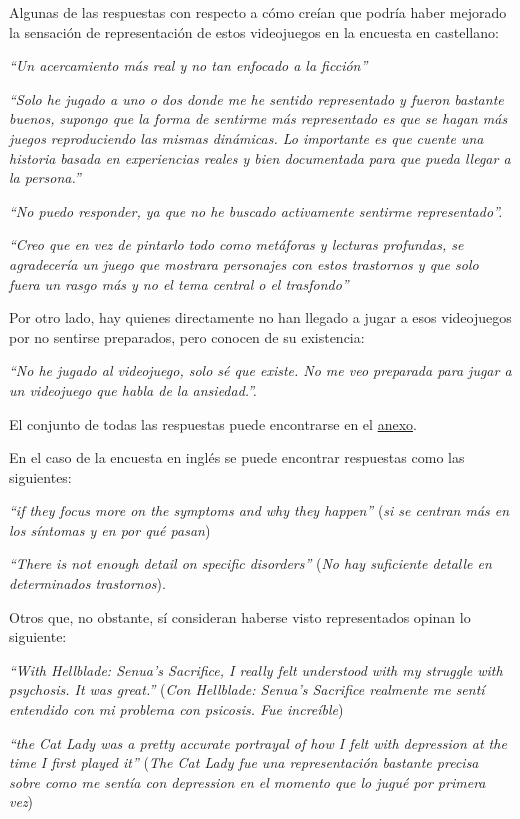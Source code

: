 \documentclass[12pt, a4paper,twoside,titlepage]{book}
\begin{document}
Algunas de las respuestas con respecto a cómo creían que podría haber mejorado la sensación de representación de estos videojuegos en la encuesta en castellano: 

\textit{``Un acercamiento más real y no tan enfocado a la ficción''}

\textit{``Solo he jugado a uno o dos donde me he sentido representado y fueron bastante buenos, supongo que la forma de sentirme más representado es que se hagan más juegos reproduciendo las mismas dinámicas. Lo importante es que cuente una historia basada en experiencias reales y bien documentada para que pueda llegar a la persona.''}

\textit{``No puedo responder, ya que no he buscado activamente sentirme representado''.}

\textit{``Creo que en vez de pintarlo todo como metáforas y lecturas profundas, se agradecería un juego que mostrara personajes con estos trastornos y que solo fuera un rasgo más y no el tema central o el trasfondo''}

Por otro lado, hay quienes directamente no han llegado a jugar a esos videojuegos por no sentirse preparados, pero conocen de su existencia: 

\textit{``No he jugado al videojuego, solo sé que existe. No me veo preparada para jugar a un videojuego que habla de la ansiedad.''. }

El conjunto de todas las respuestas puede encontrarse en el \hyperref[representacionCastellano]{anexo}. 

En el caso de la encuesta en inglés se puede encontrar respuestas como las siguientes: 

\textit{``if they focus more on the symptoms and why they happen''} (\textit{si se centran más en los síntomas y en por qué pasan})

\textit{``There is not enough detail on specific disorders''} (\textit{No hay suficiente detalle en determinados trastornos}).

Otros que, no obstante, sí consideran haberse visto representados opinan lo siguiente: 

\textit{``With Hellblade: Senua's Sacrifice, I really felt understood with my struggle with psychosis. It was great.'' }(\textit{Con Hellblade: Senua’s Sacrifice realmente me sentí entendido con mi problema con psicosis. Fue increíble}) 

\textit{``the Cat Lady was a pretty accurate portrayal of how I felt with depression at the time I first played it''} (\textit{The Cat Lady fue una representación bastante precisa sobre como me sentía con depression en el momento que lo jugué por primera vez}) 
\end{document}

